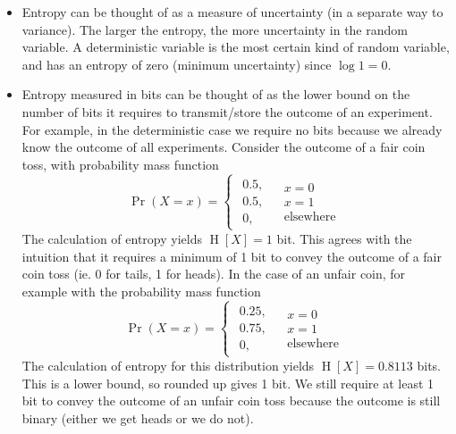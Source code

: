 \documentclass[11pt]{report} %
\begin{document}
\begin{itemize}
\item Entropy can be thought of as a measure of uncertainty (in a separate way to variance). The larger the entropy, the more uncertainty in the random variable. A deterministic variable is the most certain kind of random variable, and has an entropy of zero (minimum uncertainty) since $\log 1 = 0$.
\item Entropy measured in bits can be thought of as the lower bound on the number of bits it requires to transmit/store the outcome of an experiment. For example, in the deterministic case we require no bits because we already know the outcome of all experiments. Consider the outcome of a fair coin toss, with probability mass function
\begin{equation}
\operatorname{Pr}\left(X = x\right) = \begin{cases}
\begin{array}{c}
0.5,\\
0.5,\\
0,
\end{array} & \begin{array}{c}
x=0\\
x=1\\
\text{elsewhere}
\end{array}\end{cases}
\end{equation}
The calculation of entropy yields $\operatorname{H}\left[X\right] = 1$ bit. This agrees with the intuition that it requires a minimum of 1 bit to convey the outcome of a fair coin toss (ie. 0 for tails, 1 for heads). In the case of an unfair coin, for example with the probability mass function
\begin{equation}
\operatorname{Pr}\left(X = x\right) = \begin{cases}
\begin{array}{c}
0.25,\\
0.75,\\
0,
\end{array} & \begin{array}{c}
x=0\\
x=1\\
\text{elsewhere}
\end{array}\end{cases}
\end{equation}
The calculation of entropy for this distribution yields $\operatorname{H}\left[X\right] = 0.8113$ bits. This is a lower bound, so rounded up gives 1 bit. We still require at least 1 bit to convey the outcome of an unfair coin toss because the outcome is still binary (either we get heads or we do not). \\


\end{itemize}
\end{document}
